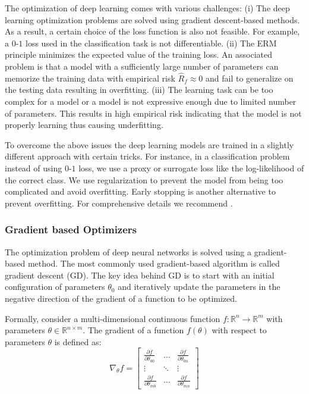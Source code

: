 The optimization of deep learning comes with various challenges: (i) The deep learning optimization problems are solved using gradient descent-based methods. As a result, a certain choice of the loss function is also not feasible. For example, a $0$-$1$ loss used in the classification task is not differentiable. 
(ii) The ERM principle minimizes the expected value of the training loss. An associated problem is that a model with a sufficiently large number of parameters can memorize the training data with empirical risk $\hat{R}_f \approx 0$ and fail to generalize on the testing data resulting in overfitting. 
(iii) The learning task can be too complex for a model or a model is not expressive enough due to limited number of parameters. This results in high empirical risk indicating that the model is not properly learning thus causing underfitting. 

To overcome the above issues the deep learning models are trained in a slightly different approach with certain tricks. For instance, in a classification problem instead of using $0$-$1$ loss, we use a proxy or surrogate loss like the log-likelihood of the correct class. We use regularization to prevent the model from being too complicated and avoid overfitting. Early stopping is another alternative to prevent overfitting. For comprehensive details we recommend \citet{Goodfellow-et-al-2016}.

\subsubsection{Gradient based Optimizers}
\label{sub:gbl}
The optimization problem of deep neural networks is solved using a gradient-based method. The most commonly used gradient-based algorithm is called gradient descent (GD). The key idea behind GD is to start with an initial configuration of parameters $\theta_0$ and iteratively update the parameters in the negative direction of the gradient of a function to be optimized. 

Formally, consider a multi-dimensional continuous function $f:\mathbb{R}^n\rightarrow\mathbb{R}^m$ with parameters $\theta\in\mathbb{R}^{n\times m}$. The gradient of a function $f(\theta)$ with respect to parameters $\theta$ is defined as:
\begin{equation}
    \label{eq:jacob}
    \nabla_{\theta} f = \begin{bmatrix}
    \frac{\partial f}{\partial \theta_{00}} & \dots  & \frac{\partial f}{\partial \theta_{0n}} \\
    \vdots & \ddots & \vdots \\
    \frac{\partial f}{\partial \theta_{m0}} & \dots  & \frac{\partial f}{\partial \theta_{mn}}
\end{bmatrix}
\end{equation}

